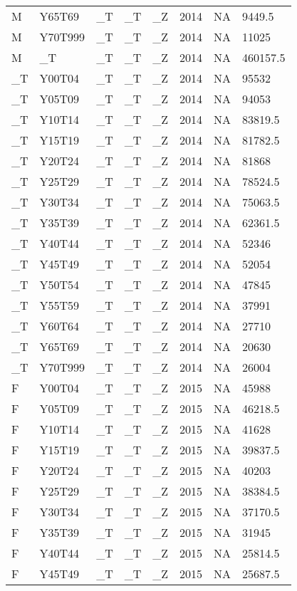 \begin{longtable}[t]{llllllll}
M & Y65T69 & \_T & \_T & \_Z & 2014 & NA & 9449.5\\
M & Y70T999 & \_T & \_T & \_Z & 2014 & NA & 11025\\
M & \_T & \_T & \_T & \_Z & 2014 & NA & 460157.5\\
\addlinespace
\_T & Y00T04 & \_T & \_T & \_Z & 2014 & NA & 95532\\
\_T & Y05T09 & \_T & \_T & \_Z & 2014 & NA & 94053\\
\_T & Y10T14 & \_T & \_T & \_Z & 2014 & NA & 83819.5\\
\_T & Y15T19 & \_T & \_T & \_Z & 2014 & NA & 81782.5\\
\_T & Y20T24 & \_T & \_T & \_Z & 2014 & NA & 81868\\
\addlinespace
\_T & Y25T29 & \_T & \_T & \_Z & 2014 & NA & 78524.5\\
\_T & Y30T34 & \_T & \_T & \_Z & 2014 & NA & 75063.5\\
\_T & Y35T39 & \_T & \_T & \_Z & 2014 & NA & 62361.5\\
\_T & Y40T44 & \_T & \_T & \_Z & 2014 & NA & 52346\\
\_T & Y45T49 & \_T & \_T & \_Z & 2014 & NA & 52054\\
\addlinespace
\_T & Y50T54 & \_T & \_T & \_Z & 2014 & NA & 47845\\
\_T & Y55T59 & \_T & \_T & \_Z & 2014 & NA & 37991\\
\_T & Y60T64 & \_T & \_T & \_Z & 2014 & NA & 27710\\
\_T & Y65T69 & \_T & \_T & \_Z & 2014 & NA & 20630\\
\_T & Y70T999 & \_T & \_T & \_Z & 2014 & NA & 26004\\
\addlinespace
F & Y00T04 & \_T & \_T & \_Z & 2015 & NA & 45988\\
F & Y05T09 & \_T & \_T & \_Z & 2015 & NA & 46218.5\\
F & Y10T14 & \_T & \_T & \_Z & 2015 & NA & 41628\\
F & Y15T19 & \_T & \_T & \_Z & 2015 & NA & 39837.5\\
F & Y20T24 & \_T & \_T & \_Z & 2015 & NA & 40203\\
\addlinespace
F & Y25T29 & \_T & \_T & \_Z & 2015 & NA & 38384.5\\
F & Y30T34 & \_T & \_T & \_Z & 2015 & NA & 37170.5\\
F & Y35T39 & \_T & \_T & \_Z & 2015 & NA & 31945\\
F & Y40T44 & \_T & \_T & \_Z & 2015 & NA & 25814.5\\
F & Y45T49 & \_T & \_T & \_Z & 2015 & NA & 25687.5\\

\end{longtable}
